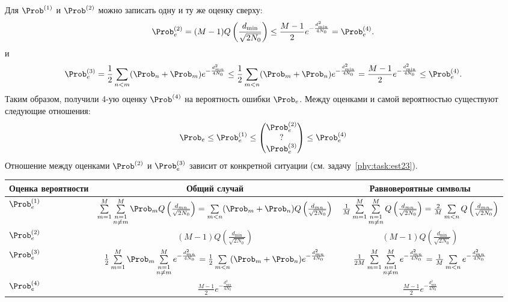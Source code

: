 \documentclass{book}
\numberwithin{theorem}{chapter}
\numberwithin{statement}{chapter}
\numberwithin{lemma}{chapter}
\theoremstyle{definition}
\numberwithin{task}{chapter}
\theoremstyle{remark}
\numberwithin{example}{chapter}
\theoremstyle{definition}
\numberwithin{definition}{chapter}
\theoremstyle{remark}
\theoremstyle{remark}
\numberwithin{lyrics}{section}
\begin{document}
Для $\Prob^{(1)}$ и $\Prob^{(2)}$ можно записать одну и ту же оценку сверху:
\begin{gather}
\Prob_e^{(2)} = (M - 1) Q\left(\frac{d_{\text{min}}}{\sqrt{2N_0}}\right) \le \frac{M-1}{2} e^{-\frac{d^2_{\text{min}}}{4N_0}} = \Prob_e^{(4)}.
\end{gather}
и
\begin{gather}
\Prob_e^{(3)} = \frac{1}{2} \Sum_{n < m} (\Prob_n + \Prob_m) e^{-\frac{d^2_{mn}}{4N_0}} \le \frac{1}{2} \Sum_{m < n}(\Prob_m + \Prob_n) e^{-\frac{d^2_{\text{min}}}{4N_0}} = \frac{M-1}{2} e^{-\frac{d^2_{\text{min}}}{4N_0}} \le \Prob_e^{(4)}.
\end{gather}
Таким образом, получили 4-ую оценку $\Prob^{(4)}$ на вероятность ошибки $\Prob_e$. Между оценками и самой вероятностью существуют следующие отношения:
\begin{gather}
\Prob_e \le \Prob_e^{(1)} \le  \begin{pmatrix}
\Prob_e^{(2)} \\
? \\
\Prob_e^{(3)}
\end{pmatrix}\le \Prob_e^{(4)}
\end{gather}
Отношение между оценками $\Prob^{(2)}$ и $\Prob^{(3)}_e$ зависит от конкретной ситуации (см. задачу~\ref{phy:task:est23}). 

\begin{table} 
\begin{tabular}{l|c|c}
Оценка вероятности & Общий случай & Равновероятные символы \\ \hline
$\Prob_{e}^{(1)}$ & $\Sum_{m=1}^M \Sum_{\substack{n = 1\\n\neq m}}^M \Prob_m Q\left(\frac{d_{mn}}{\sqrt{2N_0}}\right) = 
\Sum_{m < n} (\Prob_m + \Prob_n) Q\left(\frac{d_{mn}}{\sqrt{2N_0}}\right)$ &  
$\frac{1}{M}\sum\limits_{m = 1}^M \sum\limits_{\substack{n = 1\\m\neq n}}^M Q\left(\frac{d_{mn}}{\sqrt{2N_0}}\right) = \frac{2}{M}\sum\limits_{m < n} Q\left(\frac{d_{mn}}{\sqrt{2N_0}}\right)$ \\
$\Prob_{e}^{(2)}$ & $(M - 1) Q\left(\frac{d_{\text{min}}}{\sqrt{2N_0}}\right)$ & $(M - 1) Q\left(\frac{d_{\text{min}}}{\sqrt{2N_0}}\right)$ \\
$\Prob_{e}^{(3)}$ & $\frac{1}{2}\Sum_{m=1}^M \Prob_m \Sum_{\substack{n = 1\\n\neq m}}^M e^{-\frac{d_{mn}^2}{4N_0}} = \frac{1}{2}\Sum_{m<n}(\Prob_m + \Prob_n) e^{-\frac{d_{mn}^2}{4N_0}}$ &  
$\frac{1}{2M}\sum\limits_{m=1}^M \sum\limits_{\substack{n = 1\\n\neq m}}^M e^{-\frac{d_{mn}^2}{4N_0}} = \frac{1}{M}\sum\limits_{m < n} e^{-\frac{d_{mn}^2}{4N_0}}$ \\
$\Prob_{e}^{(4)}$ & $\frac{M-1}{2} e^{-\frac{d^2_{\text{min}}}{4N_0}}$ &  $\frac{M-1}{2} e^{-\frac{d^2_{\text{min}}}{4N_0}}$ \\ \hline
\end{tabular}
\end{table}
\end{document}
